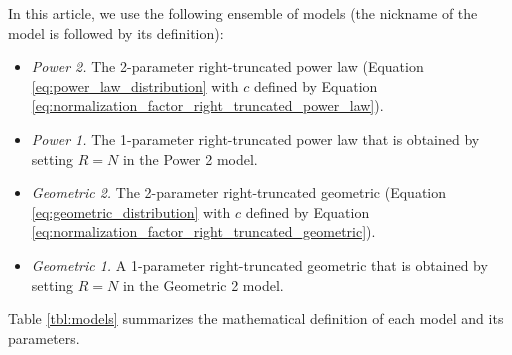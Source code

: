 \documentclass[USenglish]{article}
\begin{document}
In this article, we use the following ensemble of models (the nickname of the model is followed by its definition):
\begin{itemize}
\item 
{\em Power 2.} The 2-parameter right-truncated power law (Equation \ref{eq:power_law_distribution} with $c$ defined by Equation \ref{eq:normalization_factor_right_truncated_power_law}). \iftoggle{squib}{}{The two parameters are $\alpha$ and $R$.}
\item
{\em Power 1.} The 1-parameter right-truncated power law that is obtained by setting $R = N$ in the Power 2 model. \iftoggle{squib}{}{The only parameter is $\alpha$.}
\item
{\em Geometric 2.} The 2-parameter right-truncated geometric (Equation \ref{eq:geometric_distribution} with $c$ defined by Equation \ref{eq:normalization_factor_right_truncated_geometric}). \iftoggle{squib}{}{The two parameters are $q$ and $R$.}
\item
{\em Geometric 1.}  A 1-parameter right-truncated geometric that is obtained by setting $R = N$ in the Geometric 2 model. \iftoggle{squib}{}{The only parameter is $q$.} 
\end{itemize}
Table \ref{tbl:models} summarizes the mathematical definition of each model and its parameters.
\iftoggle{squib}{}{
Recall that we have excluded from the ensemble popular 1-parameter models such as the (untruncated) geometric model or the zeta distribution because $r$ cannot be larger than $N=24$. 
}
\end{document}
